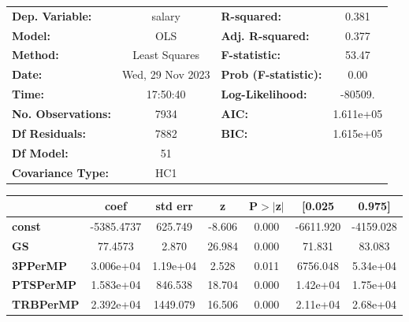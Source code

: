 \begin{center}
\begin{tabular}{lclc}
\toprule
\textbf{Dep. Variable:}       &      salary      & \textbf{  R-squared:         } &     0.381   \\
\textbf{Model:}               &       OLS        & \textbf{  Adj. R-squared:    } &     0.377   \\
\textbf{Method:}              &  Least Squares   & \textbf{  F-statistic:       } &     53.47   \\
\textbf{Date:}                & Wed, 29 Nov 2023 & \textbf{  Prob (F-statistic):} &     0.00    \\
\textbf{Time:}                &     17:50:40     & \textbf{  Log-Likelihood:    } &   -80509.   \\
\textbf{No. Observations:}    &        7934      & \textbf{  AIC:               } & 1.611e+05   \\
\textbf{Df Residuals:}        &        7882      & \textbf{  BIC:               } & 1.615e+05   \\
\textbf{Df Model:}            &          51      & \textbf{                     } &             \\
\textbf{Covariance Type:}     &       HC1        & \textbf{                     } &             \\
\bottomrule
\end{tabular}
\begin{tabular}{lcccccc}
                              & \textbf{coef} & \textbf{std err} & \textbf{z} & \textbf{P$> |$z$|$} & \textbf{[0.025} & \textbf{0.975]}  \\
\midrule
\textbf{const}                &   -5385.4737  &      625.749     &    -8.606  &         0.000        &    -6611.920    &    -4159.028     \\
\textbf{GS}                   &      77.4573  &        2.870     &    26.984  &         0.000        &       71.831    &       83.083     \\
\textbf{3PPerMP}              &    3.006e+04  &     1.19e+04     &     2.528  &         0.011        &     6756.048    &     5.34e+04     \\
\textbf{PTSPerMP}             &    1.583e+04  &      846.538     &    18.704  &         0.000        &     1.42e+04    &     1.75e+04     \\
\textbf{TRBPerMP}             &    2.392e+04  &     1449.079     &    16.506  &         0.000        &     2.11e+04    &     2.68e+04     \\

\end{tabular}
\end{center}
